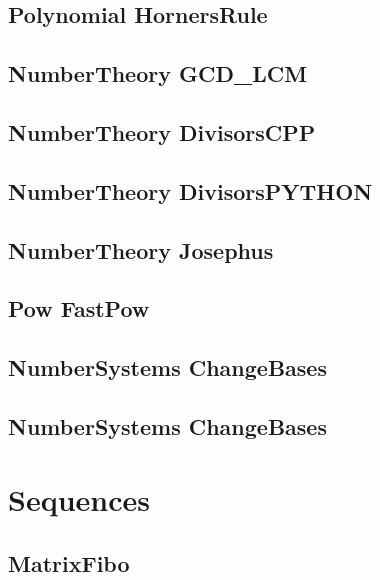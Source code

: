 \subsection{Polynomial HornersRule}
\raggedbottom
\hrulefill
\subsection{NumberTheory GCD_LCM}
\raggedbottom
\hrulefill
\subsection{NumberTheory DivisorsCPP}
\raggedbottom
\hrulefill
\subsection{NumberTheory DivisorsPYTHON}
\raggedbottom
\hrulefill
\subsection{NumberTheory Josephus}
\raggedbottom
\hrulefill
\subsection{Pow FastPow}
\raggedbottom
\hrulefill
\subsection{NumberSystems ChangeBases}
\raggedbottom
\hrulefill
\subsection{NumberSystems ChangeBases}
\raggedbottom
\hrulefill

\section{Sequences}
\subsection{ MatrixFibo}
\raggedbottom
\hrulefill

